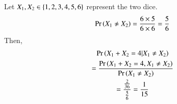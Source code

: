 Let $X_1,X_2 \in \left\{1,2,3,4,5,6\right\}$ represent the two dice.
\begin{align}
\Pr\left(X_1\ne X_2\right) = \frac{6\times5}{6\times 6}= \frac{5}{6}
\end{align}
Then,
\begin{multline}
\Pr\left(X_1+X_2 = 4| X_1\ne X_2\right) 
\\
= \frac{\Pr\left(X_1+X_2 = 4, X_1\ne X_2\right)}{\Pr\left(X_1\ne X_2\right)}
\\
= \frac{\frac{2}{36}}{\frac{5}{6}}
=\frac{1}{15}
\end{multline}
